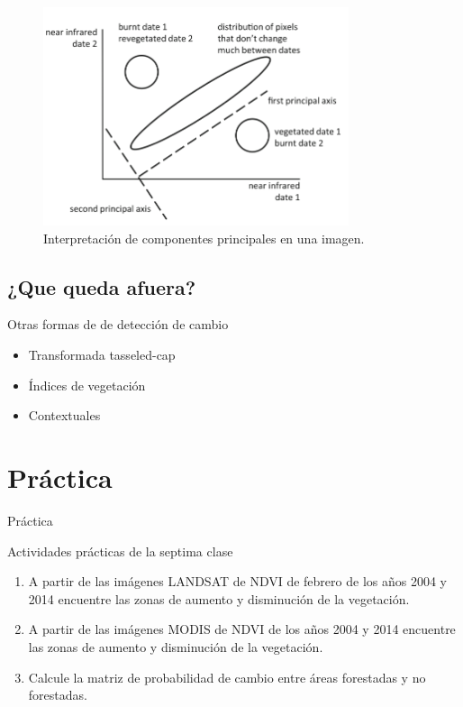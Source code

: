 \documentclass[handout,draft]{beamer}
\begin{document}
\begin{frame}{\subsecname}
  \begin{figure}
  \includegraphics[width=0.8\textwidth]{imagenes/pca_cambio.png}
  \caption{Interpretaci\'on de componentes principales en una imagen.}
  \end{figure}
\end{frame}

\subsection{¿Que queda afuera?}

\begin{frame}{\subsecname}
  \begin{block}{Otras formas de de detecci\'on de cambio}
    \begin{itemize}[<+>]
      \item Transformada tasseled-cap
      \item \'Indices de vegetaci\'on
      \item Contextuales
    \end{itemize}
  \end{block}
\end{frame}

\section{Pr\'actica}

\begin{frame}{Pr\'actica}
  \begin{exampleblock}{Actividades pr\'acticas de la septima clase}
    \begin{enumerate}
      \item A partir de las im\'agenes LANDSAT de NDVI de febrero de los a\~nos 2004 y 2014 encuentre las zonas de aumento y disminuci\'on de la vegetaci\'on.
      \item A partir de las im\'agenes MODIS de NDVI de los a\~nos 2004 y 2014 encuentre las zonas de aumento y disminuci\'on de la vegetaci\'on.
      \item Calcule la matriz de probabilidad de cambio entre \'areas forestadas y no forestadas.
    \end{enumerate}
  \end{exampleblock}
\end{frame}
\end{document}
